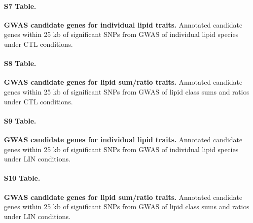 \documentclass[9pt,twocolumn,twoside]{rilabRxiv}
\begin{document}
\paragraph*{S7 Table.}    
\makeatletter
\def\@currentlabelname{S7 Table} 
\makeatother
\label{S7_Table}                                                                                   
\textbf{GWAS candidate genes for individual lipid traits.} Annotated candidate genes within 25 kb of significant SNPs from GWAS of individual lipid species under CTL conditions.               
                                                                                                 
\paragraph*{S8 Table.}
\makeatletter
\def\@currentlabelname{S8 Table} 
\makeatother
\label{S8_Table}                                                                                   
\textbf{GWAS candidate genes for lipid sum/ratio traits.} Annotated candidate genes within 25 kb of significant SNPs from GWAS of lipid class sums and ratios under CTL conditions.

\paragraph*{S9 Table.}    
\makeatletter
\def\@currentlabelname{S9 Table} 
\makeatother
\label{S9_Table}                                                                                   
\textbf{GWAS candidate genes for individual lipid traits.} Annotated candidate genes within 25 kb of significant SNPs from GWAS of individual lipid species under LIN conditions.               
                                                                                                 
\paragraph*{S10 Table.}
\makeatletter
\def\@currentlabelname{S10 Table} 
\makeatother
\label{S10_Table}                                                                                   
\textbf{GWAS candidate genes for lipid sum/ratio traits.} Annotated candidate genes within 25 kb of significant SNPs from GWAS of lipid class sums and ratios under LIN conditions.              
                       
\end{document}
